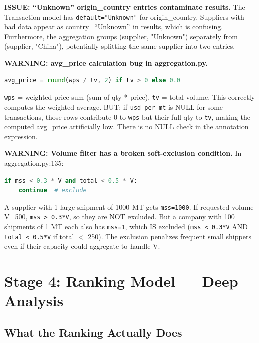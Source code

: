 \documentclass[12pt,a4paper]{article}
\begin{document}
\begin{issueBox}
\textbf{ISSUE: ``Unknown'' origin\_country entries contaminate results.}
The Transaction model has \texttt{default="Unknown"} for origin\_country. Suppliers with
bad data appear as country=``Unknown'' in results, which is confusing. Furthermore, the
aggregation groups (supplier, "Unknown") separately from (supplier, "China"), potentially
splitting the same supplier into two entries.
\end{issueBox}

\begin{warnBox}
\textbf{WARNING: avg\_price calculation bug in aggregation.py.}
\begin{lstlisting}[language=Python]
avg_price = round(wps / tv, 2) if tv > 0 else 0.0
\end{lstlisting}
\texttt{wps} = weighted price sum (sum of qty * price). \texttt{tv} = total volume. This
correctly computes the weighted average. BUT: if \texttt{usd\_per\_mt} is NULL for some
transactions, those rows contribute 0 to \texttt{wps} but their full qty to \texttt{tv},
making the computed avg\_price artificially low. There is no NULL check in the
annotation expression.
\end{warnBox}

\begin{warnBox}
\textbf{WARNING: Volume filter has a broken soft-exclusion condition.}
In aggregation.py:135:
\begin{lstlisting}[language=Python]
if mss < 0.3 * V and total < 0.5 * V:
    continue  # exclude
\end{lstlisting}
A supplier with 1 large shipment of 1000 MT gets \texttt{mss=1000}. If requested
volume V=500, \texttt{mss > 0.3*V}, so they are NOT excluded. But a company with
100 shipments of 1 MT each also has \texttt{mss=1}, which IS excluded (\texttt{mss < 0.3*V}
AND \texttt{total < 0.5*V} if total $<$ 250). The exclusion penalizes frequent small
shippers even if their capacity could aggregate to handle V.
\end{warnBox}

\section{Stage 4: Ranking Model --- Deep Analysis}

\subsection{What the Ranking Actually Does}
\end{document}
